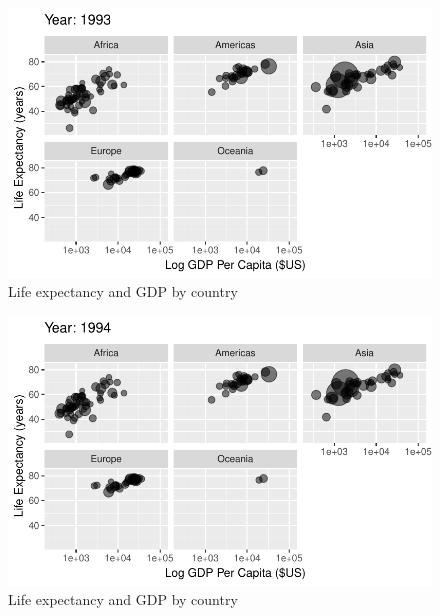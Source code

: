 \documentclass[
  letterpaper,
  DIV=11,
  numbers=noendperiod]{scrreport}
\theoremstyle{definition}
\theoremstyle{remark}
\begin{document}
\begin{figure}

{\centering \includegraphics{index_files/figure-pdf/fig-anim-lifegdp-75.pdf}

}

\caption{\label{fig-anim-lifegdp-75}Life expectancy and GDP by country}

\end{figure}

\begin{figure}

{\centering \includegraphics{index_files/figure-pdf/fig-anim-lifegdp-76.pdf}

}

\caption{\label{fig-anim-lifegdp-76}Life expectancy and GDP by country}

\end{figure}
\end{document}
